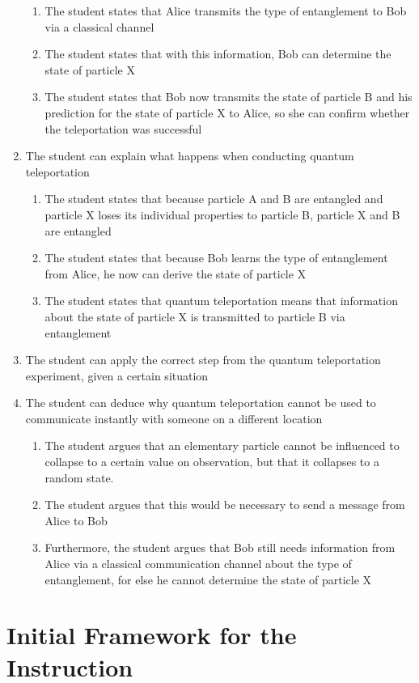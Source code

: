 \documentclass[11pt,twoside]{report} %
\begin{document}
\begin{enumerate}
\begin{enumerate}
\item The student states that Alice transmits the type of entanglement to Bob via a classical channel
\item The student states that with this information, Bob can determine the state of particle X
\item The student states that Bob now transmits the state of particle B and his prediction for the state of particle X to Alice, so she can confirm whether the teleportation was successful
\end{enumerate}
\item The student can explain what happens when conducting quantum teleportation
\begin{enumerate}
\item The student states that because particle A and B are entangled and particle X loses its individual properties to particle B, particle X and B are entangled
\item The student states that because Bob learns the type of entanglement from Alice, he now can derive the state of particle X
\item The student states that quantum teleportation means that information about the state of particle X is transmitted to particle B via entanglement
\end{enumerate}
\item The student can apply the correct step from the quantum teleportation experiment, given a certain situation
\item The student can deduce why quantum teleportation cannot be used to communicate instantly with someone on a different location
\begin{enumerate}
\item The student argues that an elementary particle cannot be influenced to collapse to a certain value on observation, but that it collapses to a random state.
\item The student argues that this would be necessary to send a message from Alice to Bob
\item Furthermore, the student argues that Bob still needs information from Alice via a classical communication channel about the type of entanglement, for else he cannot determine the state of particle X
\end{enumerate}
\end{enumerate}

\newpage

\chapter{Initial Framework for the Instruction}
\label{app:framework1}
\end{document}
